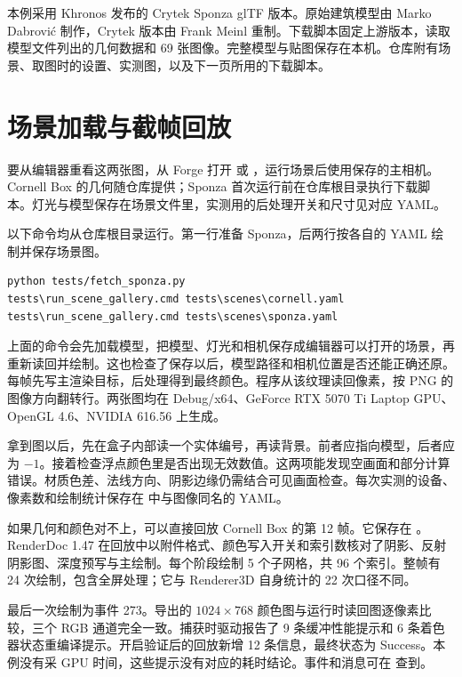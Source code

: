 本例采用 Khronos 发布的 Crytek Sponza glTF 版本。原始建筑模型由 Marko Dabrović 制作，Crytek 版本由 Frank Meinl 重制。下载脚本固定上游版本，读取模型文件列出的几何数据和 69 张图像。完整模型与贴图保存在本机。仓库附有场景、取图时的设置、实测图，以及下一页所用的下载脚本。

\quad{}

\newpage
\section{场景加载与截帧回放}
要从编辑器重看这两张图，从 Forge 打开  或 ，运行场景后使用保存的主相机。Cornell Box 的几何随仓库提供；Sponza 首次运行前在仓库根目录执行下载脚本。灯光与模型保存在场景文件里，实测用的后处理开关和尺寸见对应 YAML。

以下命令均从仓库根目录运行。第一行准备 Sponza，后两行按各自的 YAML 绘制并保存场景图。
\begin{verbatim}
python tests/fetch_sponza.py
tests\run_scene_gallery.cmd tests\scenes\cornell.yaml
tests\run_scene_gallery.cmd tests\scenes\sponza.yaml
\end{verbatim}

上面的命令会先加载模型，把模型、灯光和相机保存成编辑器可以打开的场景，再重新读回并绘制。这也检查了保存以后，模型路径和相机位置是否还能正确还原。每帧先写主渲染目标，后处理得到最终颜色。程序从该纹理读回像素，按 PNG 的图像方向翻转行。两张图均在 Debug/x64、GeForce RTX 5070 Ti Laptop GPU、OpenGL 4.6、NVIDIA 616.56 上生成。

拿到图以后，先在盒子内部读一个实体编号，再读背景。前者应指向模型，后者应为 $-1$。接着检查浮点颜色里是否出现无效数值。这两项能发现空画面和部分计算错误。材质色差、法线方向、阴影边缘仍需结合可见画面检查。每次实测的设备、像素数和绘制统计保存在  中与图像同名的 YAML。

如果几何和颜色对不上，可以直接回放 Cornell Box 的第 12 帧。它保存在 。RenderDoc 1.47 在回放中以附件格式、颜色写入开关和索引数核对了阴影、反射阴影图、深度预写与主绘制。每个阶段绘制 5 个子网格，共 96 个索引。整帧有 24 次绘制，包含全屏处理；它与 Renderer3D 自身统计的 22 次口径不同。

最后一次绘制为事件 273。导出的 $1024\times768$ 颜色图与运行时读回图逐像素比较，三个 RGB 通道完全一致。捕获时驱动报告了 9 条缓冲性能提示和 6 条着色器状态重编译提示。开启验证后的回放新增 12 条信息，最终状态为 Success。本例没有采 GPU 时间，这些提示没有对应的耗时结论。事件和消息可在  查到。




